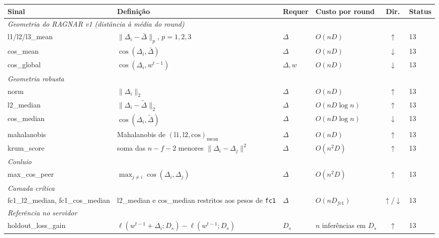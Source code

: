 \documentclass[11pt,a4paper]{article}
\begin{document}
\begin{center}
\footnotesize
\begin{longtable}{p{2.5cm}p{6.1cm}p{1.9cm}p{2.5cm}cp{1.3cm}}
\toprule
\textbf{Sinal} & \textbf{Definição} & \textbf{Requer} & \textbf{Custo por round} & \textbf{Dir.} & \textbf{Status} \\
\midrule
\endhead
\multicolumn{6}{l}{\textit{Geometria do RAGNAR v1 (distância à média do round)}} \\
\rowcolor{lightbg} l1/l2/l3\_mean & $\lVert \Delta_i - \bar\Delta \rVert_p$, $p = 1,2,3$ & $\Delta$ & $O(nD)$ & $\uparrow$ & 13 \\
cos\_mean & $\cos(\Delta_i, \bar\Delta)$ & $\Delta$ & $O(nD)$ & $\downarrow$ & 13 \\
\rowcolor{lightbg} cos\_global & $\cos(\Delta_i, w^{t-1})$ & $\Delta, w$ & $O(nD)$ & $\downarrow$ & 13 \\
\multicolumn{6}{l}{\textit{Geometria robusta}} \\
\rowcolor{lightbg} norm & $\lVert \Delta_i \rVert_2$ & $\Delta$ & $O(nD)$ & $\uparrow$ & 13 \\
l2\_median & $\lVert \Delta_i - \tilde\Delta \rVert_2$ & $\Delta$ & $O(nD \log n)$ & $\uparrow$ & 13 \\
\rowcolor{lightbg} cos\_median & $\cos(\Delta_i, \tilde\Delta)$ & $\Delta$ & $O(nD \log n)$ & $\downarrow$ & 13 \\
mahalanobis & Mahalanobis de $(\text{l1}, \text{l2}, \text{cos})_{\text{mean}}$ & $\Delta$ & $O(nD)$ & $\uparrow$ & 13 \\
\rowcolor{lightbg} krum\_score & soma das $n-f-2$ menores $\lVert\Delta_i-\Delta_j\rVert^2$~\cite{krum} & $\Delta$ & $O(n^2D)$ & $\uparrow$ & 13 \\
\multicolumn{6}{l}{\textit{Conluio}} \\
\rowcolor{lightbg} max\_cos\_peer & $\max_{j \ne i} \cos(\Delta_i, \Delta_j)$ & $\Delta$ & $O(n^2D)$ & $\uparrow$ & 13 \\
\multicolumn{6}{l}{\textit{Camada crítica}~\cite{bclayers}} \\
\rowcolor{lightbg} fc1\_l2\_median, fc1\_cos\_median & l2\_median e cos\_median restritos aos pesos de \texttt{fc1} & $\Delta$ & $O(n D_{fc1})$ & $\uparrow$/$\downarrow$ & 13 \\
\multicolumn{6}{l}{\textit{Referência no servidor}} \\
\rowcolor{lightbg} holdout\_loss\_gain & $\ell(w^{t-1}+\Delta_i; D_s) - \ell(w^{t-1}; D_s)$ & $D_s$ & $n$ inferências em $D_s$ & $\uparrow$ & 13 \\

\end{longtable}
\end{center}
\end{document}
